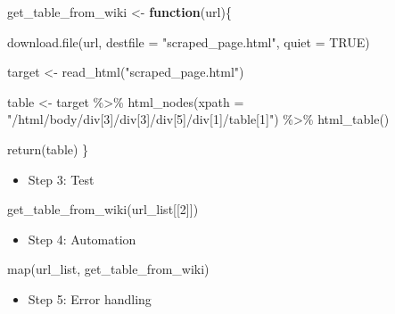 \documentclass[
]{book}
\newenvironment{Shaded}{\begin{snugshade}}{\end{snugshade}}
\newcommand{\AttributeTok}[1]{\textcolor[rgb]{0.77,0.63,0.00}{#1}}
\newcommand{\ConstantTok}[1]{\textcolor[rgb]{0.00,0.00,0.00}{#1}}
\newcommand{\ControlFlowTok}[1]{\textcolor[rgb]{0.13,0.29,0.53}{\textbf{#1}}}
\newcommand{\DecValTok}[1]{\textcolor[rgb]{0.00,0.00,0.81}{#1}}
\newcommand{\FunctionTok}[1]{\textcolor[rgb]{0.00,0.00,0.00}{#1}}
\newcommand{\NormalTok}[1]{#1}
\newcommand{\OtherTok}[1]{\textcolor[rgb]{0.56,0.35,0.01}{#1}}
\newcommand{\SpecialCharTok}[1]{\textcolor[rgb]{0.00,0.00,0.00}{#1}}
\newcommand{\StringTok}[1]{\textcolor[rgb]{0.31,0.60,0.02}{#1}}
\providecommand{\tightlist}{%
  \setlength{\itemsep}{0pt}\setlength{\parskip}{0pt}}
\begin{document}
\begin{Shaded}
\begin{Highlighting}[]
\NormalTok{get\_table\_from\_wiki }\OtherTok{\textless{}{-}} \ControlFlowTok{function}\NormalTok{(url)\{}
  
  \FunctionTok{download.file}\NormalTok{(url, }\AttributeTok{destfile =} \StringTok{"scraped\_page.html"}\NormalTok{, }\AttributeTok{quiet =} \ConstantTok{TRUE}\NormalTok{)}

\NormalTok{  target }\OtherTok{\textless{}{-}} \FunctionTok{read\_html}\NormalTok{(}\StringTok{"scraped\_page.html"}\NormalTok{)}
  
\NormalTok{  table }\OtherTok{\textless{}{-}}\NormalTok{ target }\SpecialCharTok{\%\textgreater{}\%}
    \FunctionTok{html\_nodes}\NormalTok{(}\AttributeTok{xpath =} \StringTok{"/html/body/div[3]/div[3]/div[5]/div[1]/table[1]"}\NormalTok{) }\SpecialCharTok{\%\textgreater{}\%}
    \FunctionTok{html\_table}\NormalTok{() }
  
  \FunctionTok{return}\NormalTok{(table)}
\NormalTok{\}}
\end{Highlighting}
\end{Shaded}

\begin{itemize}
\tightlist
\item
  Step 3: Test
\end{itemize}

\begin{Shaded}
\begin{Highlighting}[]
\FunctionTok{get\_table\_from\_wiki}\NormalTok{(url\_list[[}\DecValTok{2}\NormalTok{]])}
\end{Highlighting}
\end{Shaded}

\begin{itemize}
\tightlist
\item
  Step 4: Automation
\end{itemize}

\begin{Shaded}
\begin{Highlighting}[]
\FunctionTok{map}\NormalTok{(url\_list, get\_table\_from\_wiki)}
\end{Highlighting}
\end{Shaded}

\begin{itemize}
\tightlist
\item
  Step 5: Error handling
\end{itemize}
\end{document}
